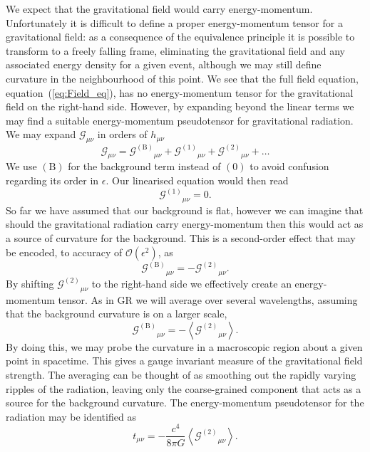 \documentclass[a4paper, 11pt, titlepage, twoside]{report}
\newcommand{\eqnref}[1]{equation~(\ref{eq:#1})}
\newcommand{\order}[1]{\ensuremath{\mathcal{O}({#1})}}
\begin{document}
{We expect that the gravitational field would carry energy-momentum. Unfortunately it is difficult to define a proper energy-momentum tensor for a gravitational field: as a consequence of the equivalence principle it is possible to transform to a freely falling frame, eliminating the gravitational field and any associated energy density for a given event, although we may still define curvature in the neighbourhood of this point. We see that the full field equation, \eqnref{Field_eq}, has no energy-momentum tensor for the gravitational field on the right-hand side. However, by expanding beyond the linear terms we may find a suitable energy-momentum pseudotensor for gravitational radiation. We may expand $\mathcal{G}_{\mu\nu}$ in orders of $h_{\mu\nu}$
\begin{equation}
\mathcal{G}_{\mu\nu} = {\mathcal{G}^{(\mathrm{B})}}_{\mu\nu} + {\mathcal{G}^{(1)}}_{\mu\nu} + {\mathcal{G}^{(2)}}_{\mu\nu} + \ldots
\label{eq:G_exp}
\end{equation}
We use $(\mathrm{B})$ for the background term instead of $(0)$ to avoid confusion regarding its order in $\epsilon$. Our linearised equation would then read
\begin{equation}
{\mathcal{G}^{(1)}}_{\mu\nu} = 0.
\end{equation}
So far we have assumed that our background is flat, however we can imagine that should the gravitational radiation carry energy-momentum then this would act as a source of curvature for the background. This is a second-order effect that may be encoded, to accuracy of $\order{\epsilon^2}$, as
\begin{equation}
{\mathcal{G}^{(\mathrm{B})}}_{\mu\nu} = -{\mathcal{G}^{(2)}}_{\mu\nu}.
\end{equation}
By shifting ${\mathcal{G}^{(2)}}_{\mu\nu}$ to the right-hand side we effectively create an energy-momentum tensor. As in GR we will average over several wavelengths, assuming that the background curvature is on a larger scale,
\begin{equation}
{\mathcal{G}^{(\mathrm{B})}}_{\mu\nu} = -\left\langle{\mathcal{G}^{(2)}}_{\mu\nu}\right\rangle.
\end{equation}
By doing this, we may probe the curvature in a macroscopic region about a given point in spacetime. This gives a gauge invariant measure of the gravitational field strength. The averaging can be thought of as smoothing out the rapidly varying ripples of the radiation, leaving only the coarse-grained component that acts as a source for the background curvature. The energy-momentum pseudotensor for the radiation may be identified as
\begin{equation}
t_{\mu\nu} = -\frac{c^4}{8\pi G}\left\langle{\mathcal{G}^{(\mathrm{2})}}_{\mu\nu}\right\rangle.
\end{equation}

}
\end{document}
